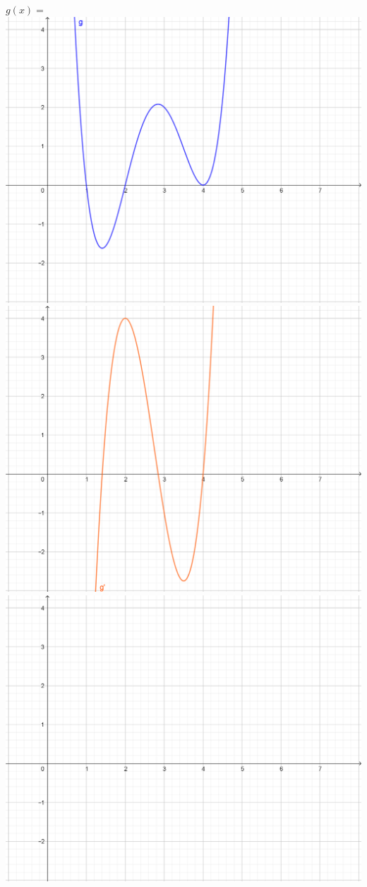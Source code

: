 \documentclass[oneside]{book}
\begin{document}
	\begin{landscape}
		\centering
		\(g(x) = \)
		\includegraphics[scale=0.85]{Bilder/UB_fkt.png}\\
		\includegraphics[scale=0.85]{Bilder/UB_fkt'.png}\\
		\includegraphics[scale=0.85]{Bilder/UB_Koord.png}
	\end{landscape}
\end{document}
